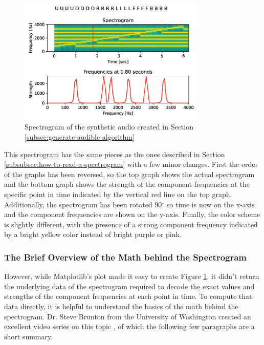 \begin{figure}[h]
    \centering
    \caption{Spectrogram of the synthetic audio created in Section \ref{subsec:generate-audible-algorithm}}
    \label{fig:spectrogram}
    \includegraphics[width=0.8\textwidth]{Figures/5 Algorithm Design/component_frequencies.png}
\end{figure}

This spectrogram has the same pieces as the ones described in Section \ref{subsubsec:how-to-read-a-spectrogram} with a few minor changes.
First the order of the graphs has been reversed, so the top graph shows the actual spectrogram and the bottom graph shows the strength of the component frequencies at the specific point in time indicated by the vertical red line on the top graph.
Additionally, the spectrogram has been rotated 90$^\circ$ so time is now on the x-axis and the component frequencies are shown on the y-axis.
Finally, the color scheme is slightly different, with the presence of a strong component frequency indicated by a bright yellow color instead of bright purple or pink.

\subsubsection{The Brief Overview of the Math behind the Spectrogram}
However, while Matplotlib's  plot \cite{matplotlib} made it easy to create Figure \ref{fig:spectrogram}, it didn't return the underlying data of the spectrogram required to decode the exact values and strengths of the component frequencies at each point in time.
To compute that data directly, it is helpful to understand the basics of the math behind the spectrogram. Dr. Steve Brunton from the University of Washington created an excellent video series on this topic \cite{fourier-analysis}, of which the following few paragraphs are a short summary.

